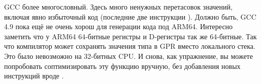 

\NonOptimizing GCC более многословный.
Здесь много ненужных перетасовок значений, включая явно избыточный код 
(последние две инструкции ).
Должно быть, GCC 4.9 пока ещё не очень хорош для генерации кода под ARM64.
Интересно заметить что у ARM64 64-битные регистры и D-регистры так же 64-битные.
Так что компилятор может сохранять значения типа \Tdouble в \ac{GPR} вместо локального стека.
Это было невозможно на 32-битных CPU.
И снова, как упражнение, вы можете попробовать соптимизировать эту функцию вручную, без добавления
новых инструкций вроде .

